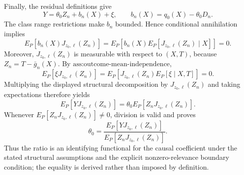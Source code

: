 Finally, the residual definitions give
\[
Y=\theta_0Z_n+b_n(X)+\xi,
\qquad
b_n(X)=q_0(X)-\theta_0D_n.
\]
The class range restrictions make \(b_n\) bounded. Hence conditional annihilation implies
\[
E_P[b_n(X)J_{z_0,\ell}(Z_n)]
=E_P\!\left[b_n(X)E_P[J_{z_0,\ell}(Z_n)\mid X]\right]
=0.
\]
Moreover, \(J_{z_0,\ell}(Z_n)\) is measurable with respect to \((X,T)\), because \(Z_n=T-\bar g_n(X)\). By \(\text{ass:outcome-mean-independence}\),
\[
E_P[\xi J_{z_0,\ell}(Z_n)]
=E_P\!\left[J_{z_0,\ell}(Z_n)E_P[\xi\mid X,T]\right]
=0.
\]
Multiplying the displayed structural decomposition by \(J_{z_0,\ell}(Z_n)\) and taking expectations therefore yields
\[
E_P[YJ_{z_0,\ell}(Z_n)]
=\theta_0E_P[Z_nJ_{z_0,\ell}(Z_n)].
\]
Whenever \(E_P[Z_nJ_{z_0,\ell}(Z_n)]\ne0\), division is valid and proves
\[
\theta_0
=\frac{E_P[YJ_{z_0,\ell}(Z_n)]}
{E_P[Z_nJ_{z_0,\ell}(Z_n)]}.
\]
Thus the ratio is an identifying functional for the causal coefficient under the stated structural assumptions and the explicit nonzero-relevance boundary condition; the equality is derived rather than imposed by definition.